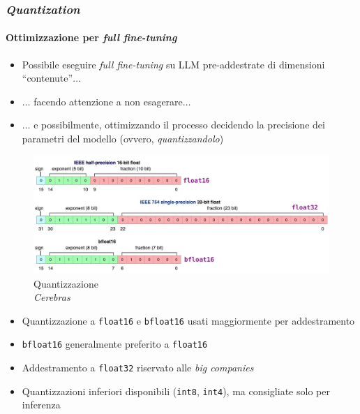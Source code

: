 \begin{frame}[t] \frametitle{\emph{Quantization}}
\framesubtitle{Ottimizzazione per \emph{full fine-tuning}}
{\scriptsize
{}
    \begin{minipage}[t]{\textwidth}
        \vspace*{-.5cm}
        \begin{itemize}[leftmargin=10pt,align=right]
            \item[\alert{\faArrowCircleRight}] Possibile eseguire \emph{full fine-tuning} su LLM pre-addestrate di dimensioni ``contenute''$\ldots$
            \item[\alert{\faArrowCircleRight}] $\ldots$ facendo attenzione a non esagerare$\ldots$
            \item[\alert{\faArrowCircleRight}] $\ldots$ e possibilmente, \alert{ottimizzando il processo} decidendo la precisione dei parametri del modello (ovvero, \emph{quantizzandolo})
        \end{itemize}
    \end{minipage}
    \begin{minipage}[t]{\textwidth}
        \vspace*{.2cm}
            \begin{figure}
                \centering
                \includegraphics[width=.7\textwidth]{img/quantization-no-bg.png}
                {\tiny\\Quantizzazione\\\vspace*{-1pt}\textit{\textcopyright Cerebras}}
            \end{figure}
    \end{minipage}
    \begin{minipage}[t]{\textwidth}
        \vspace*{.2cm}
        \begin{itemize}[leftmargin=10pt,align=right]
            \item[\alert{\faArrowCircleRight}] Quantizzazione a \texttt{float16} e \texttt{bfloat16} usati maggiormente per addestramento
            \item[\alert{\faArrowCircleRight}] \texttt{bfloat16} generalmente preferito a \texttt{float16}
            \item[\alert{\faArrowCircleRight}] Addestramento a \texttt{float32} riservato alle \emph{big companies}
            \item[\alert{\faArrowCircleRight}] Quantizzazioni inferiori disponibili (\texttt{int8}, \texttt{int4}), ma consigliate solo per inferenza
        \end{itemize}
    \end{minipage}
}
\end{frame}
